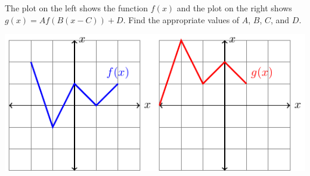 \begin{exercises}
\item The plot on the left shows the function $f(x)$ and the plot on the right shows $g(x)
    = Af(B(x-C))+D$.  Find the appropriate values of $A$, $B$, $C$, and $D$.
    \begin{center}
        \includegraphics[width=0.7\columnwidth]{figures/0-3-fig7.pdf}
    \end{center}
\begin{exerciseSolution}
\end{exerciseSolution}


\end{exercises}
